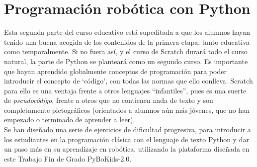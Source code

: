 \section{Programación robótica con Python}\label{sec:Python}
Esta segunda parte del curso educativo está supeditada a que los alumnos hayan tenido una buena acogida de los contenidos de la primera etapa, tanto educativa como temporalmente. Si no fuera así, y el curso de Scratch durará todo el curso natural, la parte de Python se planteará como un segundo curso. Es importante que hayan aprendido globalmente conceptos de programación para poder introducir el concepto de `código', con todas las normas que ello conlleva. Scratch para ello es una ventaja frente a otros lenguajes ``infantiles'', pues es una suerte de \textit{pseudocódigo}, frente a otros que no contienen nada de texto y son completamente pictográficos (orientados a alumnos aún más jóvenes, que no han empezado o terminado de aprender a leer). \\
Se han diseñado una serie de ejercicios de dificultad progresiva, para introducir a los estudiantes en la programación clásica con el lenguaje de texto Python y dar un paso más en su aprendizaje en robótica, utilizando la plataforma diseñada en este Trabajo Fin de Grado PyBoKids-2.0.
